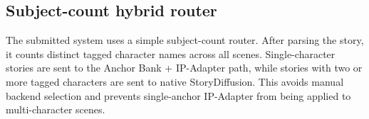 



\subsection{Subject-count hybrid router}
\label{sec:router}

The submitted system uses a simple subject-count router.
After parsing the story, it counts distinct tagged character names across all scenes.
Single-character stories are sent to the Anchor Bank + IP-Adapter path, while stories with two or more tagged characters are sent to native StoryDiffusion.
This avoids manual backend selection and prevents single-anchor IP-Adapter from being applied to multi-character scenes.


